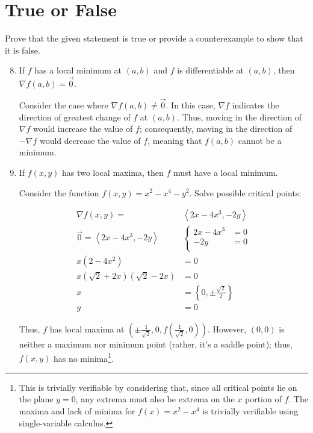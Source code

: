 \documentclass[11pt]{article}
\begin{document}
\section*{True or False}
Prove that the given statement is true or provide a counterexample to show that it is false.

\begin{enumerate}
  \setcounter{enumi}{7}

\item If \(f\) has a local minimum at \((a,b)\) and \(f\) is differentiable at
  \((a,b)\), then \(\nabla f (a,b) = \vec{0}\).

  Consider the case where \(\nabla f(a, b) \neq \vec{0}\). In this case,
  \(\nabla f\) indicates the direction of greatest change of \(f\) at
  \((a, b)\). Thus, moving in the direction of \(\nabla f\) would increase the
  value of \(f\); consequently, moving in the direction of \(-\nabla f\) would
  decrease the value of \(f\), meaning that \(f(a, b)\) cannot be a minimum.

\item If \(f(x,y)\) has two local maxima, then \(f\) must have a local minimum.

  Consider the function \(f(x, y) = x^2 - x^4 - y^2\). Solve possible
  critical points:

  \begin{align*}
    \nabla f(x, y) = &\left< 2x - 4x^3, -2y \right> \\
    \vec{0} = \left< 2x - 4x^3, -2y \right>
    &\begin{cases}
      2x - 4x^3 &= 0 \\
      -2y &= 0 \\
    \end{cases} \\
    x(2 - 4x^2) &= 0 \\
    x(\sqrt{2} + 2x)(\sqrt{2} - 2x) &= 0 \\
    x &= \left\{ 0, \pm \frac{\sqrt{2}}{2} \right\} \\
    y &= 0
  \end{align*}

  Thus, \(f\) has local maxima at
  \((\pm \frac{1}{\sqrt{2}}, 0, f(\frac{1}{\sqrt{2}}, 0))\). However, \((0, 0)\)
  is neither a maximum nor minimum point (rather, it's a saddle point); thus,
  \(f(x, y)\) has no minima\footnote{This is trivially verifiable by considering
    that, since all critical points lie on the plane \(y = 0\), any extrema must
    also be extrema on the \(x\) portion of \(f\). The maxima and lack of minima
    for \(f(x) = x^2 - x^4\) is trivially verifiable using single-variable
    calculus.}.
\end{enumerate}
\end{document}
